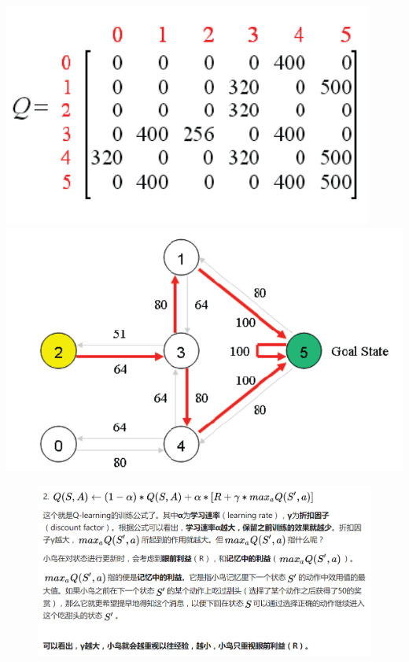 \documentclass[11pt]{article}
\makeatletter
\def\maxwidth{\ifdim\Gin@nat@width>\linewidth\linewidth
    \else\Gin@nat@width\fi}
\let\Oldincludegraphics\includegraphics
\renewcommand{\includegraphics}[1]{\Oldincludegraphics[width=.8\maxwidth]{#1}}
\makeatother
\begin{document}
    \includegraphics{Q-end.png} \includegraphics{q-result.png}

    \begin{figure}
\centering
\includegraphics{Q-para.png}
\caption{}
\end{figure}
\end{document}
